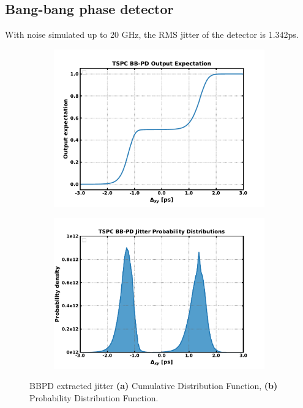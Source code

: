 \FloatBarrier
\subsection{Bang-bang phase detector}
With noise simulated up to 20 GHz, the RMS jitter of the detector is 1.342ps.

	\begin{figure}[htb!]
	    \centering
	    \begin{subfigure}{0.5\textwidth}
	        \centering
	        \includegraphics[width=1\textwidth, angle=0]{./figs/results/cdf}
	        \caption{ }
	        \label{fig:bbpd_cdf}
	    \end{subfigure}%
	    \begin{subfigure}{0.5\textwidth}
	        \centering
	        \includegraphics[width=1\textwidth, angle=0]{./figs/results/pdf}
	        \caption{ }
	        \label{fig:bbpd_pdf}
	    \end{subfigure}
	    \label{fig:bbpd_jitter_dist}
	    \caption{BBPD extracted jitter \textbf{(a)} Cumulative Distribution Function, \textbf{(b)} Probability Distribution Function.}
	\end{figure} 

